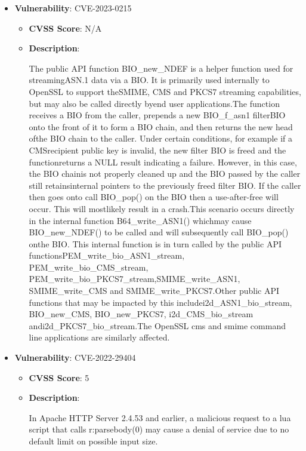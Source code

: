 \documentclass{article}
\begin{document}
\begin{itemize}
        \item \textbf{Vulnerability}: CVE-2023-0215
        \begin{itemize}
            \item \textbf{CVSS Score}:  N/A 
            \item \textbf{Description}:
            \parbox[t]{0.9\linewidth}{
                \ttfamily The public API function BIO\_new\_NDEF is a helper function used for streamingASN.1 data via a BIO. It is primarily used internally to OpenSSL to support theSMIME, CMS and PKCS7 streaming capabilities, but may also be called directly byend user applications.The function receives a BIO from the caller, prepends a new BIO\_f\_asn1 filterBIO onto the front of it to form a BIO chain, and then returns the new head ofthe BIO chain to the caller. Under certain conditions, for example if a CMSrecipient public key is invalid, the new filter BIO is freed and the functionreturns a NULL result indicating a failure. However, in this case, the BIO chainis not properly cleaned up and the BIO passed by the caller still retainsinternal pointers to the previously freed filter BIO. If the caller then goes onto call BIO\_pop() on the BIO then a use-after-free will occur. This will mostlikely result in a crash.This scenario occurs directly in the internal function B64\_write\_ASN1() whichmay cause BIO\_new\_NDEF() to be called and will subsequently call BIO\_pop() onthe BIO. This internal function is in turn called by the public API functionsPEM\_write\_bio\_ASN1\_stream, PEM\_write\_bio\_CMS\_stream, PEM\_write\_bio\_PKCS7\_stream,SMIME\_write\_ASN1, SMIME\_write\_CMS and SMIME\_write\_PKCS7.Other public API functions that may be impacted by this includei2d\_ASN1\_bio\_stream, BIO\_new\_CMS, BIO\_new\_PKCS7, i2d\_CMS\_bio\_stream andi2d\_PKCS7\_bio\_stream.The OpenSSL cms and smime command line applications are similarly affected.
            }
        \end{itemize}
    
        \item \textbf{Vulnerability}: CVE-2022-29404
        \begin{itemize}
            \item \textbf{CVSS Score}:  5 
            \item \textbf{Description}:
            \parbox[t]{0.9\linewidth}{
                \ttfamily In Apache HTTP Server 2.4.53 and earlier, a malicious request to a lua script that calls r:parsebody(0) may cause a denial of service due to no default limit on possible input size.
            }
        \end{itemize}
    

\end{itemize}
\end{document}
